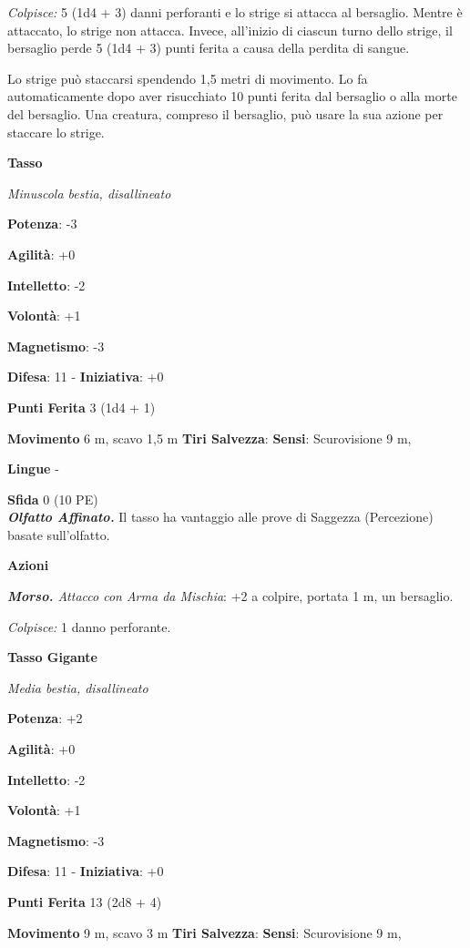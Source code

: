 \begin{multicols}{2}
\emph{Colpisce:} 5 (1d4 + 3) danni perforanti e lo strige si attacca al
bersaglio. Mentre è attaccato, lo strige non attacca. Invece, all'inizio
di ciascun turno dello strige, il bersaglio perde 5 (1d4 + 3) punti
ferita a causa della perdita di sangue.

Lo strige può staccarsi spendendo 1,5 metri di movimento. Lo fa
automaticamente dopo aver risucchiato 10 punti ferita dal bersaglio o
alla morte del bersaglio. Una creatura, compreso il bersaglio, può usare
la sua azione per staccare lo strige.

\textbf{Tasso}

\emph{Minuscola bestia, disallineato}

\textbf{Potenza}: -3

\textbf{Agilità}: +0

\textbf{Intelletto}: -2

\textbf{Volontà}: +1

\textbf{Magnetismo}: -3

\textbf{Difesa}: 11 - \textbf{Iniziativa}: +0

\textbf{Punti Ferita} 3 (1d4 + 1)

\textbf{Movimento} 6 m, scavo 1,5 m
\textbf{Tiri Salvezza}:
\textbf{Sensi}: Scurovisione 9 m, 

\textbf{Lingue} -

\textbf{Sfida} 0 (10 PE)\smallskip\\

\emph{\textbf{Olfatto Affinato.}} Il tasso ha vantaggio alle prove di
Saggezza (Percezione) basate sull'olfatto.

\smallskip\textbf{Azioni}

\emph{\textbf{Morso.} Attacco con Arma da Mischia}: +2 a colpire,
portata 1 m, un bersaglio.

\emph{Colpisce:} 1 danno perforante.

\textbf{Tasso Gigante}

\emph{Media bestia, disallineato}

\textbf{Potenza}: +2

\textbf{Agilità}: +0

\textbf{Intelletto}: -2

\textbf{Volontà}: +1

\textbf{Magnetismo}: -3

\textbf{Difesa}: 11 - \textbf{Iniziativa}: +0

\textbf{Punti Ferita} 13 (2d8 + 4)

\textbf{Movimento} 9 m, scavo 3 m
\textbf{Tiri Salvezza}:
\textbf{Sensi}: Scurovisione 9 m, 


\end{multicols}
